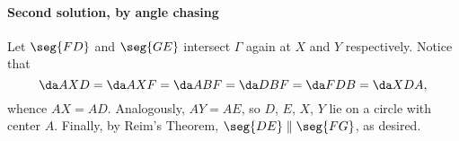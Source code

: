 \paragraph{Second solution, by angle chasing}     Let $\seg{FD}$ and $\seg{GE}$ intersect $\Gamma$ again at $X$ and $Y$ respectively. Notice that \[\da AXD=\da AXF=\da ABF=\da DBF=\da FDB=\da XDA,\]
whence $AX=AD$. Analogously, $AY=AE$, so $D$, $E$, $X$, $Y$ lie on a circle with center $A$. Finally, by Reim's Theorem, $\seg{DE}\parallel\seg{FG}$, as desired.

